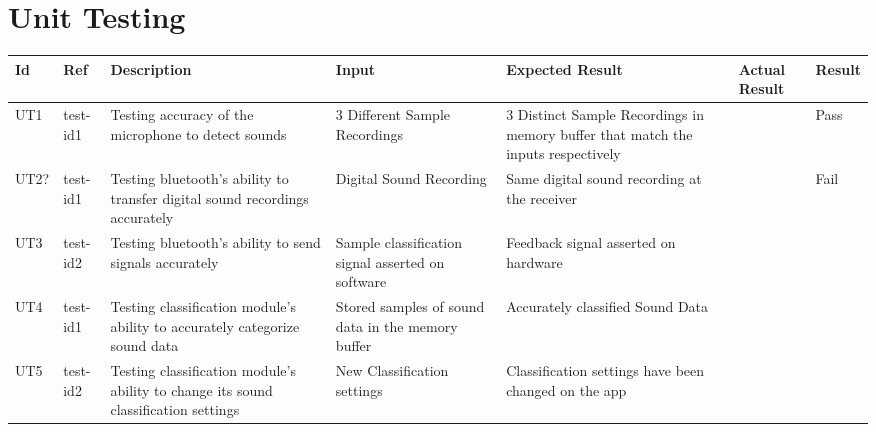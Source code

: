 \documentclass[12pt, titlepage]{article}
\begin{document}
\section{Unit Testing}
\begin{longtable}{|p{1.1cm}|p{1cm}|p{3cm}|p{1.5cm}|p{2.5cm}|p{2cm}|p{1.2cm}|}
  \hline
  \textbf{Id} & \textbf{Ref} & \textbf{Description}                                                         & \textbf{Input}                                    & \textbf{Expected Result}                                    & \textbf{Actual Result} & \textbf{Result}                                    \\ \hline
  UT1        & test-id1     & Testing accuracy of the microphone to detect sounds                                      & 3 Different Sample Recordings                             & 3 Distinct Sample Recordings in memory buffer that match the inputs respectively                    &                        & {\color[HTML]{32CB00} Pass} \\ \hline
  UT2?        & test-id1          & Testing bluetooth's ability to transfer digital sound recordings accurately                                         & Digital Sound Recording              & Same digital sound recording at the receiver                            &                        & {\color[HTML]{FE0000} Fail}                        \\ \hline
  UT3        & test-id2          & Testing bluetooth's ability to send signals accurately                                                  & Sample classification signal asserted on software                 & Feedback signal asserted on hardware                        &                        & \cellcolor[HTML]{FFFFFF}{\color[HTML]{F8A102} TBD} \\ \hline
  UT4       & test-id1          & Testing classification module's ability to accurately categorize sound data  & Stored samples of sound data in the memory buffer              & Accurately classified Sound Data                          &                        &                                                    \\ \hline
  UT5       & test-id2          & Testing classification module's ability to change its sound classification settings                                      & New Classification settings                                  & Classification settings have been changed on the app                    &                        &                                                    \\ \hline

\end{longtable}
\end{document}
